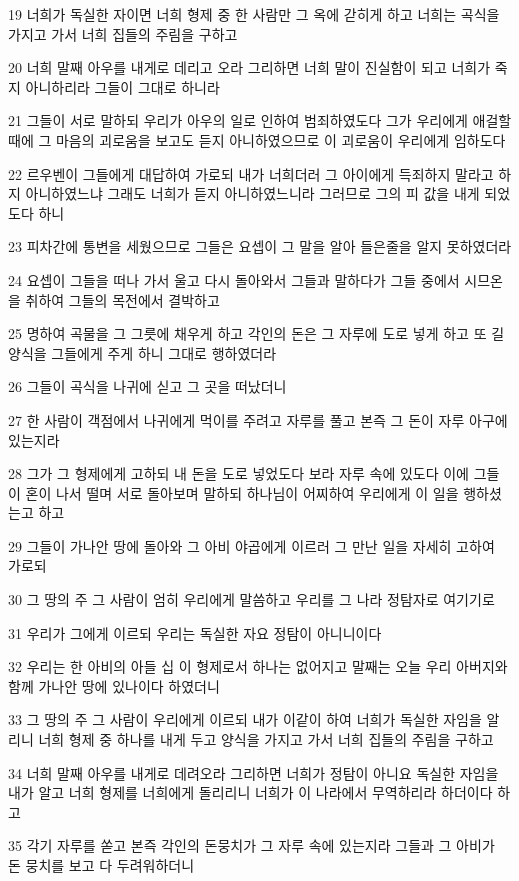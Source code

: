 \par 19 너희가 독실한 자이면 너희 형제 중 한 사람만 그 옥에 갇히게 하고 너희는 곡식을 가지고 가서 너희 집들의 주림을 구하고
\par 20 너희 말째 아우를 내게로 데리고 오라 그리하면 너희 말이 진실함이 되고 너희가 죽지 아니하리라 그들이 그대로 하니라
\par 21 그들이 서로 말하되 우리가 아우의 일로 인하여 범죄하였도다 그가 우리에게 애걸할때에 그 마음의 괴로움을 보고도 듣지 아니하였으므로 이 괴로움이 우리에게 임하도다
\par 22 르우벤이 그들에게 대답하여 가로되 내가 너희더러 그 아이에게 득죄하지 말라고 하지 아니하였느냐 그래도 너희가 듣지 아니하였느니라 그러므로 그의 피 값을 내게 되었도다 하니
\par 23 피차간에 통변을 세웠으므로 그들은 요셉이 그 말을 알아 들은줄을 알지 못하였더라
\par 24 요셉이 그들을 떠나 가서 울고 다시 돌아와서 그들과 말하다가 그들 중에서 시므온을 취하여 그들의 목전에서 결박하고
\par 25 명하여 곡물을 그 그릇에 채우게 하고 각인의 돈은 그 자루에 도로 넣게 하고 또 길 양식을 그들에게 주게 하니 그대로 행하였더라
\par 26 그들이 곡식을 나귀에 싣고 그 곳을 떠났더니
\par 27 한 사람이 객점에서 나귀에게 먹이를 주려고 자루를 풀고 본즉 그 돈이 자루 아구에 있는지라
\par 28 그가 그 형제에게 고하되 내 돈을 도로 넣었도다 보라 자루 속에 있도다 이에 그들이 혼이 나서 떨며 서로 돌아보며 말하되 하나님이 어찌하여 우리에게 이 일을 행하셨는고 하고
\par 29 그들이 가나안 땅에 돌아와 그 아비 야곱에게 이르러 그 만난 일을 자세히 고하여 가로되
\par 30 그 땅의 주 그 사람이 엄히 우리에게 말씀하고 우리를 그 나라 정탐자로 여기기로
\par 31 우리가 그에게 이르되 우리는 독실한 자요 정탐이 아니니이다
\par 32 우리는 한 아비의 아들 십 이 형제로서 하나는 없어지고 말째는 오늘 우리 아버지와 함께 가나안 땅에 있나이다 하였더니
\par 33 그 땅의 주 그 사람이 우리에게 이르되 내가 이같이 하여 너희가 독실한 자임을 알리니 너희 형제 중 하나를 내게 두고 양식을 가지고 가서 너희 집들의 주림을 구하고
\par 34 너희 말째 아우를 내게로 데려오라 그리하면 너희가 정탐이 아니요 독실한 자임을 내가 알고 너희 형제를 너희에게 돌리리니 너희가 이 나라에서 무역하리라 하더이다 하고
\par 35 각기 자루를 쏟고 본즉 각인의 돈뭉치가 그 자루 속에 있는지라 그들과 그 아비가 돈 뭉치를 보고 다 두려워하더니
